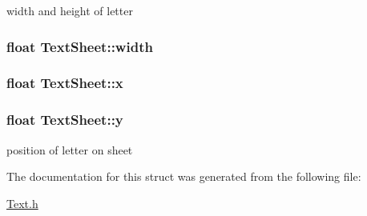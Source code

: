 width and height of letter 

\hypertarget{struct_text_sheet_ad6936392d4f6bff5f79288576dc0a0c5}{}
\subsubsection[{width}]{\setlength{\rightskip}{0pt plus 5cm}float Text\+Sheet\+::width}\label{struct_text_sheet_ad6936392d4f6bff5f79288576dc0a0c5}
\hypertarget{struct_text_sheet_ad77c30ab829b250b59126699057ef255}{}
\subsubsection[{x}]{\setlength{\rightskip}{0pt plus 5cm}float Text\+Sheet\+::x}\label{struct_text_sheet_ad77c30ab829b250b59126699057ef255}
\hypertarget{struct_text_sheet_a47c8f71a0888383a2a012aba5c4e492f}{}
\subsubsection[{y}]{\setlength{\rightskip}{0pt plus 5cm}float Text\+Sheet\+::y}\label{struct_text_sheet_a47c8f71a0888383a2a012aba5c4e492f}


position of letter on sheet 



The documentation for this struct was generated from the following file\+:\begin{DoxyCompactItemize}
\item 
\hyperlink{_text_8h}{Text.\+h}\end{DoxyCompactItemize}
